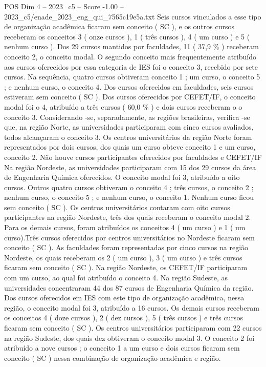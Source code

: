 \begin{textsample}{POS Dim 4 – 2023\_c5 – Score -1.00 – 2023\_c5/enade\_2023\_eng\_qui\_7565c19e5a.txt}
Seis cursos vinculados a esse tipo de organização acadêmica ficaram sem conceito ( SC ), e os outros cursos receberam os conceitos 3 ( onze cursos ), 1 ( três cursos ), 4 ( um curso ) e 5 ( nenhum curso ).
Dos 29 cursos mantidos por faculdades, 11 ( 37,9 \% ) receberam conceito 2, o conceito modal.
O segundo conceito mais frequentemente atribuído aos cursos oferecidos por essa categoria de IES foi o conceito 3, recebido por sete cursos.
Na sequência, quatro cursos obtiveram conceito 1 ; um curso, o conceito 5 ; e nenhum curso, o conceito 4.
Dos cursos oferecidos em faculdades, seis cursos estiveram sem conceito ( SC ).
Dos cursos oferecidos por CEFET/IF, o conceito modal foi o 4, atribuído a três cursos ( 60,0 \% ) e dois cursos receberam o o conceito 3.
Considerando -se, separadamente, as regiões brasileiras, verifica -se que, na região Norte, as universidades participaram com cinco cursos avaliados, todos alcançaram o conceito 3.
Os centros universitários da região Norte foram representados por dois cursos, dos quais um curso obteve conceito 1 e um curso, conceito 2.
Não houve cursos participantes oferecidos por faculdades e CEFET/IF Na região Nordeste, as universidades participaram com 15 dos 29 cursos da área de Engenharia Química oferecidos.
O conceito modal foi 3, atribuído a oito cursos.
Outros quatro cursos obtiveram o conceito 4 ; três cursos, o conceito 2 ; nenhum curso, o conceito 5 ; e nenhum curso, o conceito 1.
Nenhum curso ficou sem conceito ( SC ).
Os centros universitários contaram com oito cursos participantes na região Nordeste, três dos quais receberam o conceito modal 2.
Para os demais cursos, foram atribuídos os conceitos 4 ( um curso ) e 1 ( um curso).Três cursos oferecidos por centros universitários no Nordeste ficaram sem conceito ( SC ).
As faculdades foram representadas por cinco cursos na região Nordeste, os quais receberam os 2 ( um curso ), 3 ( um curso ) e três cursos ficaram sem conceito ( SC ).
Na região Nordeste, os CEFET/IF participaram com um curso, ao qual foi atribuído o conceito 4.
Na região Sudeste, as universidades concentraram 44 dos 87 cursos de Engenharia Química da região.
Dos cursos oferecidos em IES com este tipo de organização acadêmica, nessa região, o conceito modal foi 3, atribuído a 16 cursos.
Os demais cursos receberam os conceitos 4 ( doze cursos ), 2 ( dez cursos ), 5 ( três cursos ) e três cursos ficaram sem conceito ( SC ).
Os centros universitários participaram com 22 cursos na região Sudeste, dos quais dez obtiveram o conceito modal 3.
O conceito 2 foi atribuído a nove cursos ; o conceito 1 a um curso e dois cursos ficaram sem conceito ( SC ) nessa combinação de organização acadêmica e região.

\end{textsample}
